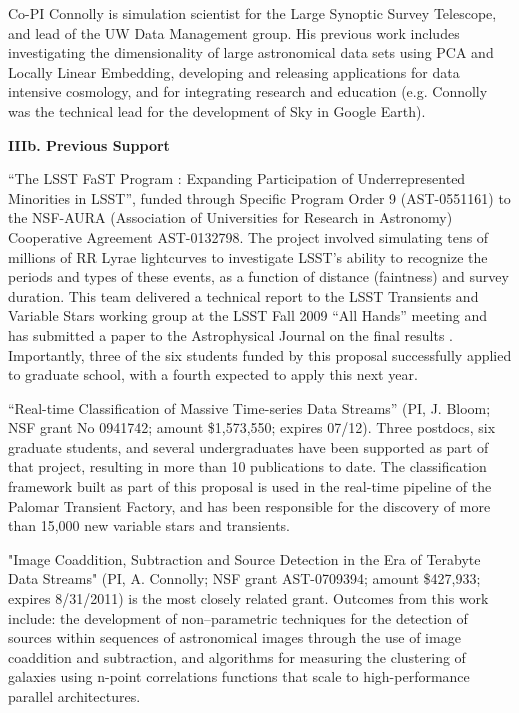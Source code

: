  \smallskip

Co-PI Connolly is simulation scientist for the Large Synoptic Survey Telescope,
and lead of the UW Data Management group.  His previous work includes
investigating the dimensionality of large astronomical data sets using PCA and
Locally Linear Embedding, developing and releasing applications for data
intensive cosmology, and for integrating research and education (e.g. Connolly
was the technical lead for the development of Sky in Google Earth).

\bigskip \centerline{\bf IIIb. Previous Support} \smallskip

 \smallskip

``The LSST FaST Program : Expanding Participation of Underrepresented Minorities
in LSST'', funded through Specific Program Order 9 (AST-0551161) to the NSF-AURA
(Association of Universities for Research in Astronomy) Cooperative Agreement
AST-0132798.  The project involved simulating tens of millions of RR Lyrae
lightcurves to investigate LSST's ability to recognize the periods and types of
these events, as a function of distance (faintness) and survey duration.  This
team delivered a technical report to the LSST Transients and Variable Stars
working group at the LSST Fall 2009 ``All Hands'' meeting and has submitted a
paper to the Astrophysical Journal on the final results \citep{RRLyrae}.
Importantly, three of the six students funded by this proposal successfully
applied to graduate school, with a fourth expected to apply this next year.

 \smallskip

``Real-time Classification of Massive Time-series Data Streams'' (PI, J. Bloom;
NSF grant No 0941742; amount \$1,573,550; expires 07/12).  Three postdocs, six
graduate students, and several undergraduates have been supported as part of
that project, resulting in more than 10 publications to date.  The
classification framework built as part of this proposal is used in the real-time
pipeline of the Palomar Transient Factory, and has been responsible for the
discovery of more than 15,000 new variable stars and transients.

 \smallskip

"Image Coaddition, Subtraction and Source Detection in the Era of Terabyte Data
Streams" (PI, A. Connolly; NSF grant AST-0709394; amount \$427,933; expires
8/31/2011) is the most closely related grant.  Outcomes from this work include:
the development of non--parametric techniques for the detection of sources
within sequences of astronomical images through the use of image coaddition and
subtraction, and algorithms for measuring the clustering of galaxies using
n-point correlations functions that scale to high-performance parallel
architectures.

